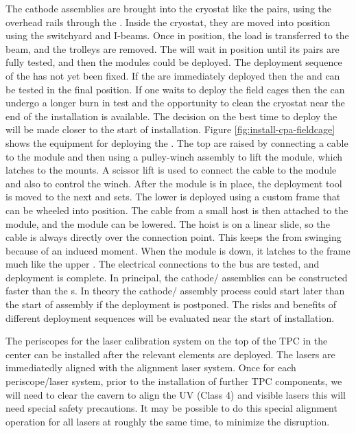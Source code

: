 The cathode  assemblies are brought into the cryostat like the  pairs, using the overhead rails through the . Inside the cryostat, they are moved into position using the  switchyard and  I-beams. 
Once in position, the load is transferred to the  beam, and the trolleys are removed. 
The  will wait in position until its  pairs are fully tested, and then the  modules could be deployed. 
The deployment sequence of the  has not yet been fixed. 
If the  are immediately deployed then the  and  can be tested in the final position. 
If one waits to deploy the field cages then the  can undergo a longer burn in test and the opportunity to clean the cryostat near the end of the installation is available. The decision on the best time to deploy the  will be made closer to the start of installation.
Figure \ref{fig:install-cpa-fieldcage} shows the equipment for deploying the . 
The top  are raised by connecting a cable to the module and then using a pulley-winch assembly to lift the module, which latches to the  mounts. 
A scissor lift is used to connect the cable to the module and also to control the winch. 
After the module is in place, the deployment tool is moved to the next and  sets. 
The lower  is deployed using a custom frame that can be wheeled into position. 
The cable from a small host is then attached to the  module, and the module can be lowered. 
The hoist is on a linear slide, so the cable is always directly over the connection point. 
This keeps the  from swinging because of an induced moment. 
When the module is down, it latches to the  frame much like the upper . 
The electrical connections to the  bus are tested, and deployment is complete. 
In principal, the cathode/ assemblies can be constructed faster than the s. 
In theory the cathode/ assembly process could start later than the start of  assembly if the deployment is postponed. 
 The risks and benefits of different deployment sequences will be evaluated near the start of installation.

The periscopes for the laser calibration system on the top of the TPC in the center can be installed after the relevant  elements are deployed. The lasers are immediatedly aligned with the alignment laser system. 
Once for each periscope/laser system, prior to the installation of further TPC components, we will need to clear the cavern to align the UV (Class 4) and visible lasers this will need special safety precautions. 
It may be possible to do this special alignment operation for all lasers at roughly the same time, to minimize the disruption.

